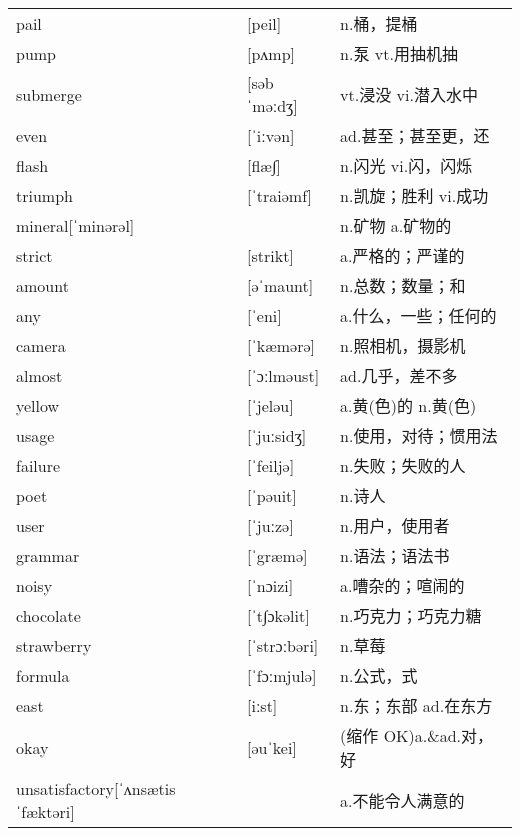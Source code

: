 \documentclass[a4paper]{article}
\begin{document}
\section{}
\begin{tabular}{l l l}

pail & [peil] & n.桶，提桶 \\
pump & [pʌmp] & n.泵 vt.用抽机抽 \\
submerge & [səbˈməːdʒ] & vt.浸没 vi.潜入水中 \\
even & [ˈiːvən] & ad.甚至；甚至更，还 \\
flash & [flæ∫] & n.闪光 vi.闪，闪烁 \\
triumph & [ˈtraiəmf] & n.凯旋；胜利 vi.成功 \\
mineral[ˈminərəl] &  & n.矿物 a.矿物的 \\
strict & [strikt] & a.严格的；严谨的 \\
amount & [əˈmaunt] & n.总数；数量；和 \\
any & [ˈeni] & a.什么，一些；任何的 \\
camera & [ˈkæmərə] & n.照相机，摄影机 \\
almost & [ˈɔːlməust] & ad.几乎，差不多 \\
yellow & [ˈjeləu] & a.黄(色)的 n.黄(色) \\
usage & [ˈjuːsidʒ] & n.使用，对待；惯用法 \\
failure & [ˈfeiljə] & n.失败；失败的人 \\
poet & [ˈpəuit] & n.诗人 \\
user & [ˈjuːzə] & n.用户，使用者 \\
grammar & [ˈgræmə] & n.语法；语法书 \\
noisy & [ˈnɔizi] & a.嘈杂的；喧闹的 \\
chocolate & [ˈt∫ɔkəlit] & n.巧克力；巧克力糖 \\
strawberry & [ˈstrɔːbəri] & n.草莓 \\
formula & [ˈfɔːmjulə] & n.公式，式 \\
east & [iːst] & n.东；东部 ad.在东方 \\
okay & [əuˈkei] & (缩作 OK)a.\&ad.对，好 \\
unsatisfactory[ˈʌnsætisˈfæktəri] &  & a.不能令人满意的 \\

\end{tabular}
\end{document}
